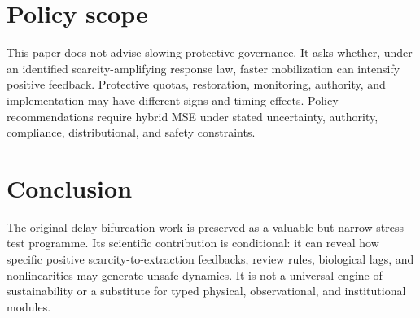 \documentclass[11pt]{article}
\begin{document}
\section{Policy scope}
This paper does not advise slowing protective governance. It asks whether, under an identified scarcity-amplifying response law, faster mobilization can intensify positive feedback. Protective quotas, restoration, monitoring, authority, and implementation may have different signs and timing effects. Policy recommendations require hybrid MSE under stated uncertainty, authority, compliance, distributional, and safety constraints.

\section{Conclusion}
The original delay-bifurcation work is preserved as a valuable but narrow stress-test programme. Its scientific contribution is conditional: it can reveal how specific positive scarcity-to-extraction feedbacks, review rules, biological lags, and nonlinearities may generate unsafe dynamics. It is not a universal engine of sustainability or a substitute for typed physical, observational, and institutional modules.
\end{document}
